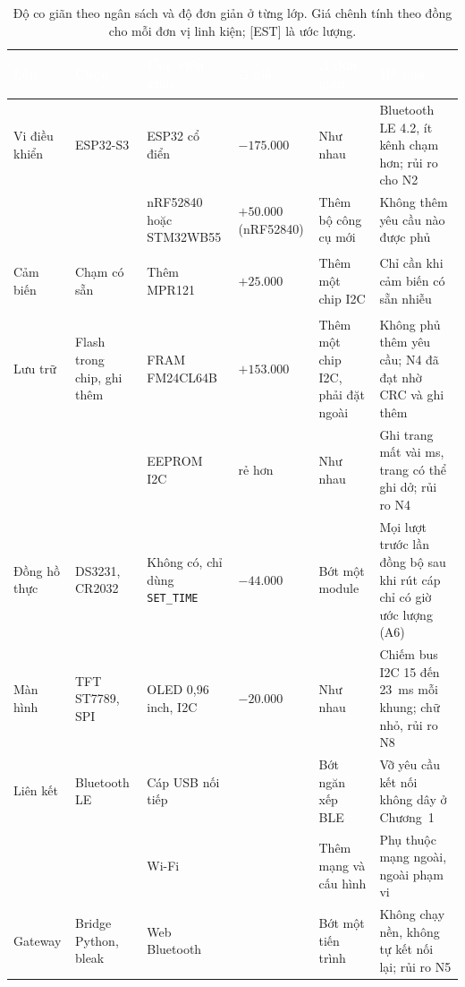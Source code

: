 \begin{table}[H]
    \centering
    \small
    \renewcommand{\arraystretch}{1.3}
    \caption{Độ co giãn theo ngân sách và độ đơn giản ở từng lớp. Giá chênh tính theo đồng cho mỗi đơn vị linh kiện; [EST] là ước lượng.}
    \label{tab:elasticity}
    \begin{tabular}{>{\bfseries\raggedright\arraybackslash}m{1.7cm} >{\raggedright\arraybackslash}m{2.3cm} >{\raggedright\arraybackslash}m{2.4cm} >{\raggedright\arraybackslash}m{1.6cm} >{\raggedright\arraybackslash}m{2.1cm} >{\raggedright\arraybackslash}m{3.2cm}}
        \toprule
        \rowcolor{haitayblue}
        \textcolor{white}{Lớp} & \textcolor{white}{Chọn} & \textcolor{white}{Ứng viên khác} & \textcolor{white}{$\Delta$ giá} & \textcolor{white}{$\Delta$ đơn giản} & \textcolor{white}{Hệ quả} \\
        \midrule
        \rowcolor{haitayblue!8}
        Vi điều khiển & ESP32-S3 & ESP32 cổ điển & $-175.000$ & Như nhau & Bluetooth LE 4.2, ít kênh chạm hơn; rủi ro cho N2 \\
         & & nRF52840 hoặc STM32WB55 & $+50.000$ (nRF52840) & Thêm bộ công cụ mới & Không thêm yêu cầu nào được phủ \\
        \rowcolor{haitayblue!8}
        Cảm biến & Chạm có sẵn & Thêm MPR121 & $+25.000$ & Thêm một chip I2C & Chỉ cần khi cảm biến có sẵn nhiễu \\
        Lưu trữ & Flash trong chip, ghi thêm & FRAM FM24CL64B & $+153.000$ & Thêm một chip I2C, phải đặt ngoài & Không phủ thêm yêu cầu; N4 đã đạt nhờ CRC và ghi thêm \\
        \rowcolor{haitayblue!8}
         & & EEPROM I2C & [EST] rẻ hơn & Như nhau & Ghi trang mất vài ms, trang có thể ghi dở; rủi ro N4 \\
        Đồng hồ thực & DS3231, CR2032 & Không có, chỉ dùng \texttt{SET\_TIME} & $-44.000$ & Bớt một module & Mọi lượt trước lần đồng bộ sau khi rút cáp chỉ có giờ ước lượng (A6) \\
        \rowcolor{haitayblue!8}
        Màn hình & TFT ST7789, SPI & OLED 0,96 inch, I2C & $-20.000$ & Như nhau & Chiếm bus I2C 15 đến 23~ms mỗi khung; chữ nhỏ, rủi ro N8 \\
        Liên kết & Bluetooth LE & Cáp USB nối tiếp & 0 & Bớt ngăn xếp BLE & Vỡ yêu cầu kết nối không dây ở Chương~1 \\
        \rowcolor{haitayblue!8}
         & & Wi-Fi & 0 & Thêm mạng và cấu hình & Phụ thuộc mạng ngoài, ngoài phạm vi \\
        Gateway & Bridge Python, bleak & Web Bluetooth & 0 & Bớt một tiến trình & Không chạy nền, không tự kết nối lại; rủi ro N5 \\

\end{tabular}
\end{table}
